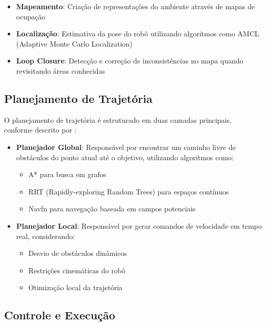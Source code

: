\begin{itemize}
    \item \textbf{Mapeamento}: Criação de representações do ambiente através de mapas de ocupação
    \item \textbf{Localização}: Estimativa da pose do robô utilizando algoritmos como AMCL (Adaptive Monte Carlo Localization)
    \item \textbf{Loop Closure}: Detecção e correção de inconsistências no mapa quando revisitando áreas conhecidas
\end{itemize}

\subsection{Planejamento de Trajetória}

O planejamento de trajetória é estruturado em duas camadas principais, conforme
descrito por \cite{Karaman2011Optimal}:

\begin{itemize}
    \item \textbf{Planejador Global}: Responsável por encontrar um caminho livre de obstáculos do ponto atual até o objetivo, utilizando algoritmos como:
          \begin{itemize}
              \item A* para busca em grafos
              \item RRT (Rapidly-exploring Random Trees) para espaços contínuos
              \item Navfn para navegação baseada em campos potenciais
          \end{itemize}

    \item \textbf{Planejador Local}: Responsável por gerar comandos de velocidade em tempo real, considerando:
          \begin{itemize}
              \item Desvio de obstáculos dinâmicos
              \item Restrições cinemáticas do robô
              \item Otimização local da trajetória
          \end{itemize}
\end{itemize}

\subsection{Controle e Execução}


